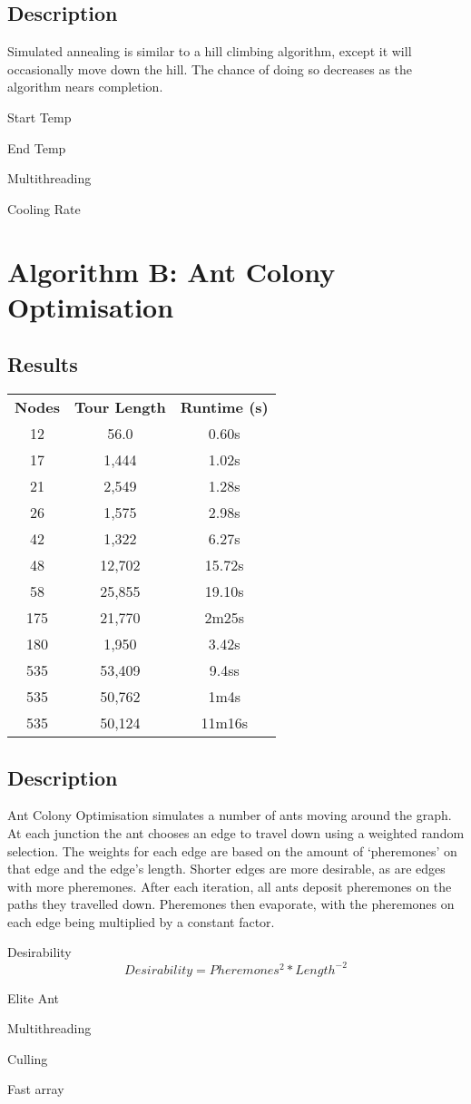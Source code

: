 \documentclass[a4paper, 11pt,table]{article}
\begin{document}
\subsection{Description}
Simulated annealing is similar to a hill climbing algorithm, except it will occasionally move down the hill. The chance of doing so decreases as the algorithm nears completion.

Start Temp

End Temp

Multithreading

Cooling Rate
	
	\section{Algorithm B: Ant Colony Optimisation}
	
		\subsection{Results}
	\label{useCase:antResults}
	\begin{center}
		\begin{tabu}{|c c c|}
			\textbf{Nodes} & \textbf{Tour Length} & \textbf{Runtime (s)}\\
			12 & 56.0 & 0.60s \\
			17 & 1,444 & 1.02s\\
			21 & 2,549 & 1.28s\\
			26 & 1,575 & 2.98s\\
			42 & 1,322 & 6.27s\\
			48 & 12,702 & 15.72s\\
			58 & 25,855 & 19.10s\\
			175 &  21,770 & 2m25s\\
			180 & 1,950 & 3.42s\\
			535 & 53,409 & 9.4ss\\
			535 & 50,762 & 1m4s\\
			535 & 50,124 & 11m16s\\
		\end{tabu}
	\end{center}

\subsection{Description}
Ant Colony Optimisation simulates a number of ants moving around the graph. At each junction the ant chooses an edge to travel down using a weighted random selection. The weights for each edge are based on the amount of `pheremones' on that edge and the edge's length. Shorter edges are more desirable, as are edges with more pheremones. After each iteration, all ants deposit pheremones on the paths they travelled down. Pheremones then evaporate, with the pheremones on each edge being multiplied by a constant factor.

Desirability
\begin{equation}
Desirability = Pheremones^{2}*Length^{-2}
\end{equation}

Elite Ant

Multithreading

Culling

Fast array
	
\end{document}
